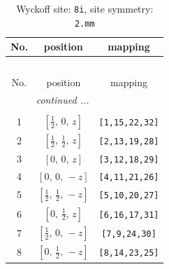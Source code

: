 \documentclass[fleqn,8pt]{jsarticle}
\begin{document}
\renewcommand{\arraystretch}{1.2}
\begin{longtable}{ccc}
\caption{Wyckoff site: {\tt 8i}, site symmetry: {\tt 2.mm}}
 \\
 \hline \hline
No. & position & mapping \\ \hline \endfirsthead

\multicolumn{2}{l}{\tablename\ \thetable{}} \\
 \hline \hline
No. & position & mapping \\ \hline \endhead

 \hline \hline
\multicolumn{2}{r}{\footnotesize\it continued ...} \\ \endfoot

 \hline \hline
\multicolumn{2}{r}{} \\ \endlastfoot

1 & $\left[ \frac{1}{2},\, 0,\, z \right]$ & {\tt [1,15,22,32]} \\ \hline
2 & $\left[ \frac{1}{2},\, \frac{1}{2},\, z \right]$ & {\tt [2,13,19,28]} \\ \hline
3 & $\left[ 0,\, 0,\, z \right]$ & {\tt [3,12,18,29]} \\ \hline
4 & $\left[ 0,\, 0,\, - z \right]$ & {\tt [4,11,21,26]} \\ \hline
5 & $\left[ \frac{1}{2},\, \frac{1}{2},\, - z \right]$ & {\tt [5,10,20,27]} \\ \hline
6 & $\left[ 0,\, \frac{1}{2},\, z \right]$ & {\tt [6,16,17,31]} \\ \hline
7 & $\left[ \frac{1}{2},\, 0,\, - z \right]$ & {\tt [7,9,24,30]} \\ \hline
8 & $\left[ 0,\, \frac{1}{2},\, - z \right]$ & {\tt [8,14,23,25]} \\
\end{longtable}
\renewcommand{\arraystretch}{1.2}
\end{document}
